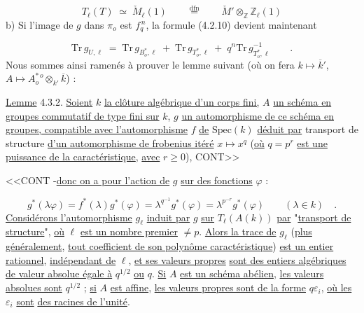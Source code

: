 \begin{equation*}
T_\ell(T) \;\simeq\; \check{M}_\ell(1) \qquad \stackrel{\mathrm{dfn}}{=} \qquad \check{M}' \otimes_{\mathbb{Z}} \mathbb{Z}_\ell(1)
\end{equation*}
b) Si l'image de $g$ dans $\pi_o$ est $f_q^{\,n}$, la formule (4.2.10) devient maintenant

\begin{equation}\tag{4.3.1}
\mathrm{Tr}\, g_{U,\ell} \;=\; \mathrm{Tr}\, g_{B^{*}_{o},\ell} \;+\; \mathrm{Tr}\, g_{T^{*}_{o},\ell} \;+\; q^{n}\mathrm{Tr}\, g^{-1}_{T^{*}_{o},\ell} \qquad .
\end{equation}
Nous sommes ainsi ramenés à prouver le lemme suivant (où on fera $k \longmapsto \overline{k}'$, $A \longmapsto A^{*\,o}_{o} \otimes_{k'} \overline{k}$) :

\underline{Lemme} 4.3.2. \underline{Soient} $k$ \underline{la clôture algébrique d'un corps fini,} $A$ \underline{un schéma en groupes commutatif de type fini sur} $k$, $g$ \underline{un automorphisme de ce schéma en groupes, compatible avec l'automorphisme} $f$ \underline{de} $\mathrm{Spec}(k)$ \underline{déduit par} transport de structure \underline{d'un automorphisme de frobenius itéré} $x \longmapsto x^q$ (\underline{où} $q = p^{r}$ \underline{est une puissance de la caractéristique}, \underline{avec} $r \geq 0$), CONT>>



<<CONT -\underline{donc on a pour l'action de} $g$ \underline{sur des fonctions} $\varphi$ :

\begin{equation*}
g^*(\lambda\varphi) = f^*(\lambda)g^*(\varphi) = \lambda^{q^{-1}} g^*(\varphi) = \lambda^{p^{-r}} g^*(\varphi) \qquad (\lambda \in k) \quad .
\end{equation*}
\underline{Considérons l'automorphisme} $g_\ell$ \underline{induit par} $g$ \underline{sur} $T_\ell(A(k))$ \underline{par} "\underline{transport de structure}", \underline{où} $\ell$ \underline{est un nombre premier} $\neq p$. \underline{Alors la trace de} $g_\ell$ (\underline{plus généralement}, \underline{tout coefficient de son polynôme caractéristique}) \underline{est un entier rationnel}, \underline{indépendant de} $\ell$, \underline{et ses valeurs propres} \underline{sont des entiers algébriques de valeur absolue égale à} $q^{1/2}$ \underline{ou} $q$. \underline{Si} $A$ \underline{est un schéma abélien}, \underline{les valeurs absolues sont} $q^{1/2}$ ; \underline{si} $A$ \underline{est affine}, \underline{les valeurs propres sont de la forme} $q\varepsilon_i$, \underline{où les} $\varepsilon_i$ \underline{sont} \underline{des racines de l'unité}.

